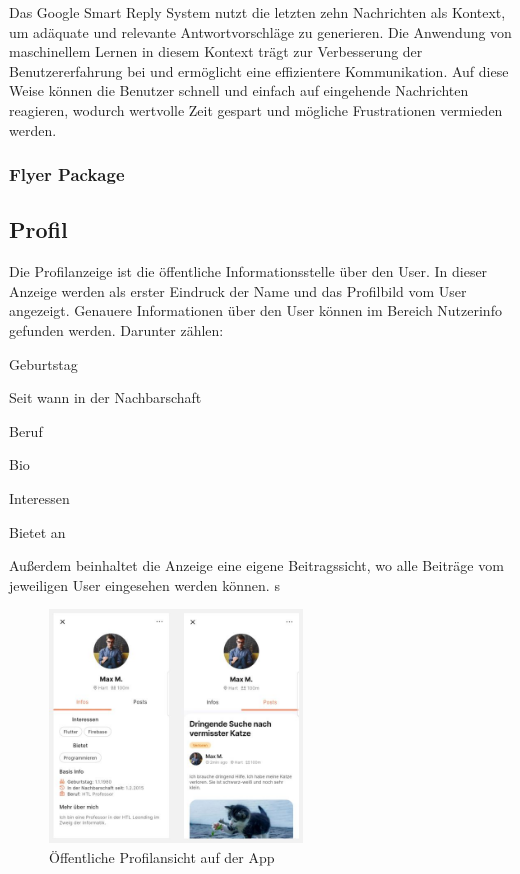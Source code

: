 Das Google Smart Reply System nutzt die letzten zehn Nachrichten als Kontext, um adäquate und relevante Antwortvorschläge zu generieren. Die Anwendung von maschinellem Lernen in diesem Kontext trägt zur Verbesserung der Benutzererfahrung bei und ermöglicht eine effizientere Kommunikation. Auf diese Weise können die Benutzer schnell und einfach auf eingehende Nachrichten reagieren, wodurch wertvolle Zeit gespart und mögliche Frustrationen vermieden werden.

\subsubsection{Flyer Package}

\subsection{Profil}
Die Profilanzeige ist die öffentliche Informationsstelle über den User. In dieser Anzeige werden als erster Eindruck der Name und das Profilbild vom User angezeigt. Genauere Informationen über den User können im Bereich Nutzerinfo gefunden werden. Darunter zählen:
\begin{compactitem}
  \item Geburtstag
  \item Seit wann in der Nachbarschaft
  \item Beruf
  \item Bio
  \item Interessen
  \item Bietet an
\end{compactitem}
Außerdem beinhaltet die Anzeige eine eigene Beitragssicht, wo alle Beiträge vom jeweiligen User eingesehen werden können.
s
\begin{figure}[H]
  \centering
  \includegraphics[width=0.6\textwidth]{pics/public-profile.JPG}
  \caption{Öffentliche Profilansicht auf der App}
\end{figure}

